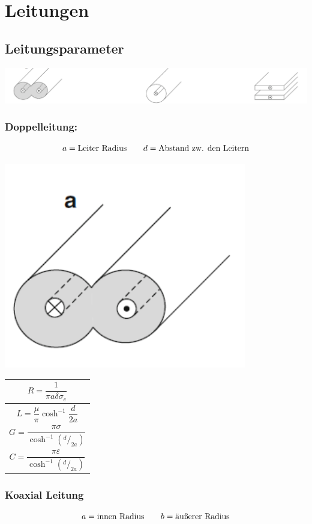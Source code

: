 \section{Leitungen}

\subsection{Leitungsparameter}

\includegraphics[width=\columnwidth]{Figures/Leitungsparameter.png}

\subsubsection{Doppelleitung:}
\[
    a = \text{Leiter Radius} \qquad d = \text{Abstand zw. den Leitern} \\
\]

\includegraphics[width=0.4\columnwidth]{Figures/Doppelleitung.png}
{\renewcommand*{\arraystretch}{0.2}
\begin{tabularx}{0.5\columnwidth}{|X|}
    \hline
    \[R  = \frac{1}{\pi a\delta\sigma_c}\]              \\
    \hline
    \[L = \frac{\mu}{\pi} \cosh^{-1}\frac{d}{2a}\]      \\
    \hline
    \[G = \frac{\pi\sigma}{\cosh^{-1}(^d/_{2a})}\]      \\
    \hline
    \[C = \frac{\pi\varepsilon}{\cosh^{-1}(^d/_{2a})}\] \\
    \hline
\end{tabularx}}

\subsubsection{Koaxial Leitung}
\[
    a = \text{innen Radius} \qquad b = \text{äußerer Radius} \\
\]

